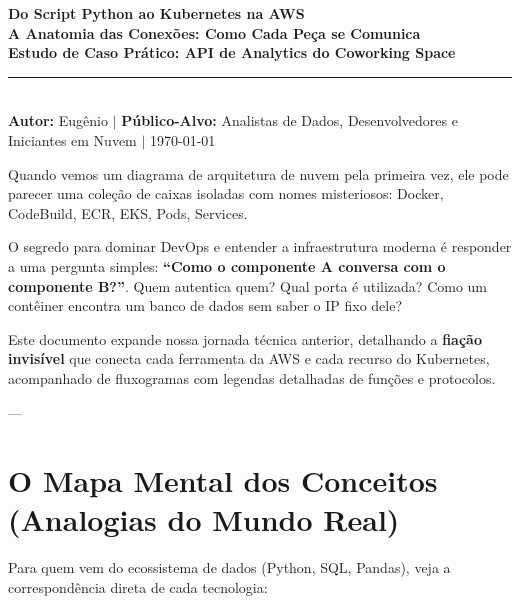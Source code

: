 \documentclass[11pt,a4paper]{article}
\begin{document}
\begin{center}
    {\Huge \textbf{\textcolor{awsnavy}{Do Script Python ao Kubernetes na AWS}}}\\[0.25cm]
    {\Large \textbf{\textcolor{awsorange}{A Anatomia das Conexões: Como Cada Peça se Comunica}}}\\[0.2cm]
    {\normalsize \textbf{Estudo de Caso Prático: API de Analytics do Coworking Space}}\\[0.2cm]
    \rule{\textwidth}{1.2pt}\\[0.25cm]
    {\footnotesize \textbf{Autor:} Eugênio $\vert$ \textbf{Público-Alvo:} Analistas de Dados, Desenvolvedores e Iniciantes em Nuvem $\vert$ \today}
\end{center}

\vspace{0.2cm}

\begin{tcolorbox}[colback=codebg,colframe=awsnavy,title=\textbf{Prefácio: O Enigma da Conectividade em Nuvem},fonttitle=\bfseries]
Quando vemos um diagrama de arquitetura de nuvem pela primeira vez, ele pode parecer uma coleção de caixas isoladas com nomes misteriosos: Docker, CodeBuild, ECR, EKS, Pods, Services. 

O segredo para dominar DevOps e entender a infraestrutura moderna é responder a uma pergunta simples: \textbf{``Como o componente A conversa com o componente B?''}. Quem autentica quem? Qual porta é utilizada? Como um contêiner encontra um banco de dados sem saber o IP fixo dele?

Este documento expande nossa jornada técnica anterior, detalhando a \textbf{fiação invisível} que conecta cada ferramenta da AWS e cada recurso do Kubernetes, acompanhado de fluxogramas com legendas detalhadas de funções e protocolos.
\end{tcolorbox}

---

\section{O Mapa Mental dos Conceitos (Analogias do Mundo Real)}

Para quem vem do ecossistema de dados (Python, SQL, Pandas), veja a correspondência direta de cada tecnologia:
\end{document}
